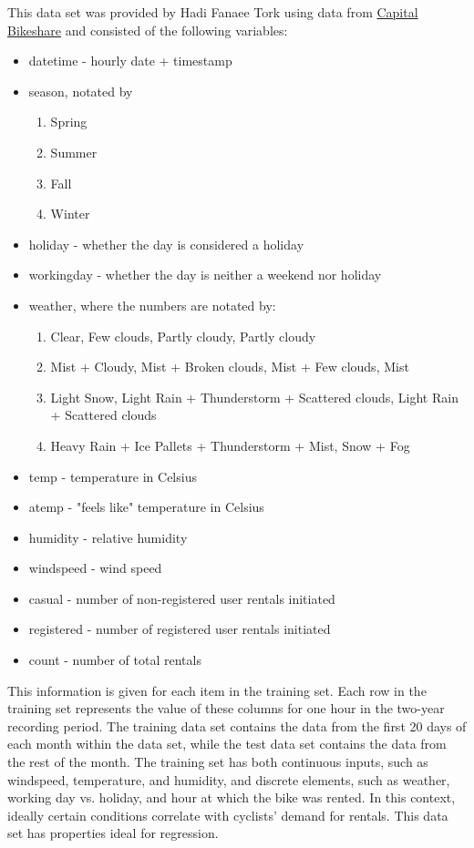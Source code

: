 \documentclass[11pt]{article}
\begin{document}
This data set was provided by Hadi Fanaee Tork using data from \href{https://www.capitalbikeshare.com/system-data}{Capital Bikeshare} and consisted of the following variables:
\begin{itemize}
\item datetime - hourly date + timestamp
\item season, notated by \begin{enumerate}
\item Spring
\item Summer
\item Fall
\item Winter
\end{enumerate}
\item holiday - whether the day is considered a holiday
\item workingday - whether the day is neither a weekend nor holiday
\item weather, where the numbers are notated by:\begin{enumerate}
\item Clear, Few clouds, Partly cloudy, Partly cloudy
\item Mist + Cloudy, Mist + Broken clouds, Mist + Few clouds, Mist
\item Light Snow, Light Rain + Thunderstorm + Scattered clouds, Light Rain + Scattered clouds
\item Heavy Rain + Ice Pallets + Thunderstorm + Mist, Snow + Fog
\end{enumerate}
\item temp - temperature in Celsius
\item atemp - "feels like" temperature in Celsius
\item humidity - relative humidity
\item windspeed - wind speed
\item casual - number of non-registered user rentals initiated
\item registered - number of registered user rentals initiated
\item count - number of total rentals
\end{itemize}

This information is given for each item in the training set. Each row in the training set represents the value of these columns for one hour in the two-year recording period. The training data set contains the data from the first 20 days of each month within the data set, while the test data set contains the data from the rest of the month. The training set has both continuous inputs, such as windspeed, temperature, and humidity, and discrete elements, such as weather, working day vs. holiday, and hour at which the bike was rented. In this context, ideally certain conditions correlate with cyclists' demand for rentals. This data set has properties ideal for regression. \\
\end{document}
